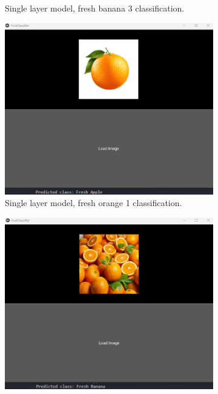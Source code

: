 \documentclass[conference]{IEEEtran}
\begin{document}
\begin{figure}[h]
\begin{subfigure}[b]{0.48\linewidth}
        \caption{Single layer model, fresh banana 3 classification.}
        \label{figFB}
    \end{subfigure}
    \hfill
    \begin{subfigure}[b]{0.48\linewidth}
        \centering
        \includegraphics[width=\linewidth]{1layer orage1.png}
        \caption{Single layer model, fresh orange 1 classification.}
        \label{figFA}
    \end{subfigure}
    \hfill
    \begin{subfigure}[b]{0.48\linewidth}
        \centering
        \includegraphics[width=\linewidth]{1layer orage2.png}

\end{subfigure}
\end{figure}
\end{document}
